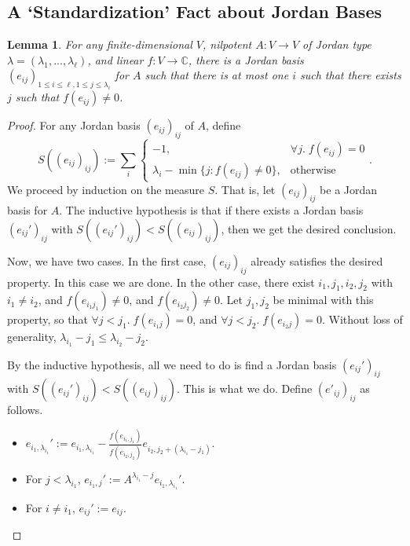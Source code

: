 \documentclass[12pt,psamsfonts]{article}
\newtheorem{lemma}[theorem]{Lemma}
\begin{document}
\subsection{A `Standardization' Fact about Jordan Bases}
\begin{lemma}\label{normalization_helper_one}
    For any finite-dimensional \(V\), nilpotent \(A : V \to V\) of Jordan type \(\lambda = (\lambda_1, ..., \lambda_\ell)\), and linear \(f : V \to \mathbb{C}\), there is a Jordan basis \((e_{ij})_{1 \leq i \leq \ell, 1 \leq j \leq \lambda_i}\) for \(A\) such that there is at most one \(i\) such that there exists \(j\) such that \(f(e_{ij}) \neq 0\).
\end{lemma}
\begin{proof}
    For any Jordan basis \((e_{ij})_{ij}\) of \(A\), define
    \[S((e_{ij})_{ij}) := \sum_i \begin{cases}-1, & \forall j. \; f (e_{ij}) = 0 \\ \lambda_i - \min\{j : f (e_{ij}) \neq 0\}, & \textrm{otherwise} \end{cases}.\]
    We proceed by induction on the measure \(S\).
    That is, let \((e_{ij})_{ij}\) be a Jordan basis for \(A\).
    The inductive hypothesis is that if there exists a Jordan basis \((e_{ij}')_{ij}\) with \(S((e_{ij}')_{ij}) < S((e_{ij})_{ij})\), then we get the desired conclusion.
    \par Now, we have two cases.
    In the first case, \((e_{ij})_{ij}\) already satisfies the desired property.
    In this case we are done.
    In the other case, there exist \(i_1, j_1, i_2, j_2\) with \(i_1 \neq i_2\), and \(f(e_{i_1j_1}) \neq 0\), and \(f(e_{i_2j_2}) \neq 0\).
    Let \(j_1, j_2\) be minimal with this property, so that \(\forall j < j_1. \; f(e_{i_1j}) = 0\), and \(\forall j < j_2. \; f(e_{i_2j}) = 0\).
    Without loss of generality, \(\lambda_{i_1} - j_1 \leq \lambda_{i_2} - j_2\).
    \par By the inductive hypothesis, all we need to do is find a Jordan basis \((e_{ij}')_{ij}\) with \(S((e_{ij}')_{ij}) < S((e_{ij})_{ij})\).
    This is what we do.
    Define \((e'_{ij})_{ij}\) as follows.
    \begin{itemize}
        \item \(e_{i_1, \lambda_{i_1}}' := e_{i_1, \lambda_{i_1}} - \frac{f(e_{i_1, j_1})}{f(e_{i_2, j_2})}e_{i_2, j_2 + (\lambda_{i_1} - j_1)}\).
        \item For \(j < \lambda_{i_1}\), \(e_{i_1, j}' := A^{\lambda_{i_1} - j} e_{i_1, \lambda_{i_1}}'\).
        \item For \(i \neq i_1\), \(e_{ij}' := e_{ij}\).

\end{itemize}
\end{proof}
\end{document}
